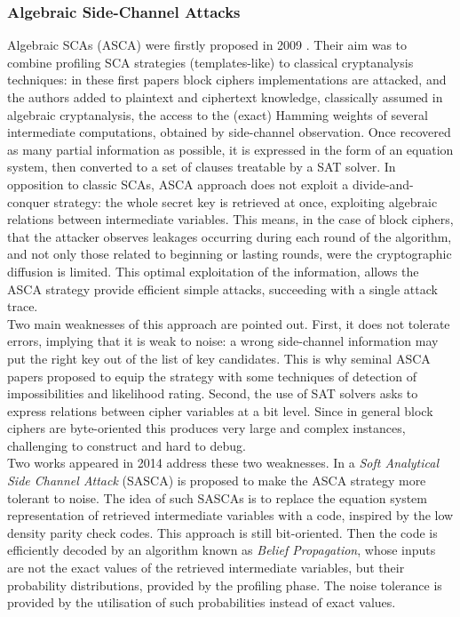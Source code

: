 \subsubsection{Algebraic Side-Channel Attacks}
Algebraic SCAs (ASCA) were firstly proposed in 2009 \cite{ASCA,renauld2009algebraic}. Their aim was to combine profiling SCA strategies (templates-like) to classical cryptanalysis techniques: in these first papers block ciphers implementations are attacked, and the authors added to plaintext and ciphertext knowledge, classically assumed in algebraic cryptanalysis, the access to the (exact) Hamming weights of  several intermediate computations, obtained by side-channel observation. Once recovered as many partial information as possible, it is expressed in the form of an equation system, then converted to a set of clauses treatable by a SAT solver. In opposition to classic SCAs, ASCA approach does not exploit a divide-and-conquer strategy: the whole secret key is retrieved at once, exploiting algebraic relations between intermediate variables. This means, in the case of block ciphers, that the attacker observes leakages occurring during each round of the algorithm, and not only those related to beginning or lasting rounds, were the cryptographic diffusion is limited. This optimal exploitation of the information, allows the ASCA strategy provide efficient simple attacks, \ie succeeding with a single attack trace.\\
Two main weaknesses of this approach are pointed out. First, it does not tolerate errors, implying that it is weak to noise: a wrong side-channel information may put the right key out of the list of key candidates. This is why seminal ASCA papers proposed to equip the strategy with some techniques of detection of impossibilities and likelihood rating. Second, the use of SAT solvers asks to express relations between cipher variables at a bit level. Since in general block ciphers are byte-oriented this produces very large and complex instances, challenging to construct and hard to debug.\\
Two works appeared in 2014 address these two weaknesses. In \cite{soft} a \emph{Soft Analytical Side Channel Attack} (SASCA) is proposed to make the ASCA strategy more tolerant to noise. The idea of such SASCAs is to replace the equation system representation of retrieved intermediate variables with a code, inspired by the low density parity check codes. This approach is still bit-oriented. Then the code is efficiently decoded by an algorithm known as \emph{Belief Propagation}, whose inputs are not the exact values of the retrieved intermediate variables, but their probability distributions, provided by the profiling phase. The noise tolerance is provided by the utilisation of such probabilities instead of exact values. \\
